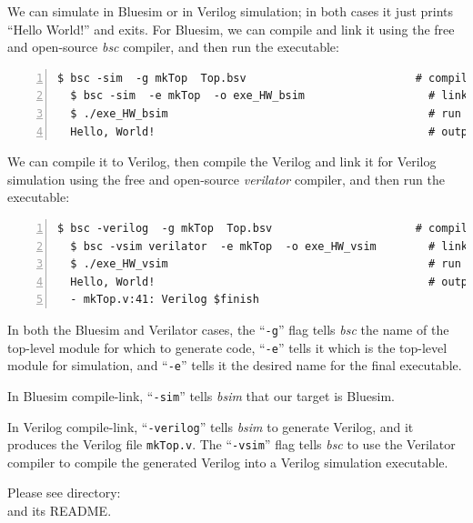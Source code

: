 \vspace{1ex}

We can simulate in Bluesim or in Verilog simulation; in both cases it
just prints ``Hello World!'' and exits.  For Bluesim, we can compile
and link it using the free and open-source \emph{bsc} compiler, and
then run the executable:

{\small
\begin{Verbatim}[frame=single, numbers=left]
  $ bsc -sim  -g mkTop  Top.bsv                          # compile
  $ bsc -sim  -e mkTop  -o exe_HW_bsim                   # link
  $ ./exe_HW_bsim                                        # run
  Hello, World!                                          # output
\end{Verbatim}
}

We can compile it to Verilog, then compile the Verilog and link it for
Verilog simulation using the free and open-source \emph{verilator}
compiler, and then run the executable:

{\small
\begin{Verbatim}[frame=single, numbers=left]
  $ bsc -verilog  -g mkTop  Top.bsv                      # compile -> mkTop.v
  $ bsc -vsim verilator  -e mkTop  -o exe_HW_vsim        # link
  $ ./exe_HW_vsim                                        # run
  Hello, World!                                          # output
  - mkTop.v:41: Verilog $finish
\end{Verbatim}
}

In both the Bluesim and Verilator cases, the ``\verb|-g|'' flag tells
\emph{bsc} the name of the top-level module for which to generate
code, ``\verb|-e|'' tells it which is the top-level module for
simulation, and ``\verb|-e|'' tells it the desired name for the final
executable.

In Bluesim compile-link, ``\verb|-sim|'' tells \emph{bsim} that our
target is Bluesim.

In Verilog compile-link, ``\verb|-verilog|'' tells \emph{bsim} to
generate Verilog, and it produces the Verilog file \verb|mkTop.v|.
The ``\verb|-vsim|'' flag tells \emph{bsc} to use the Verilator
compiler to compile the generated Verilog into a Verilog simulation
executable.

\Beginexercise

Please see directory:  \\
and its README.
\Endexercise

